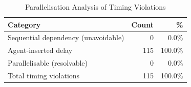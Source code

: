 \begin{table}[h]
\centering
\caption{Parallelisation Analysis of Timing Violations}
\label{tab:parallel_order}
\begin{tabular}{lrr}
\toprule
Category & Count & \% \\
\midrule
Sequential dependency (unavoidable) & 0 & 0.0\% \\
Agent-inserted delay & 115 & 100.0\% \\
Parallelisable (resolvable) & 0 & 0.0\% \\
\midrule
Total timing violations & 115 & 100.0\% \\
\bottomrule
\end{tabular}
\end{table}
